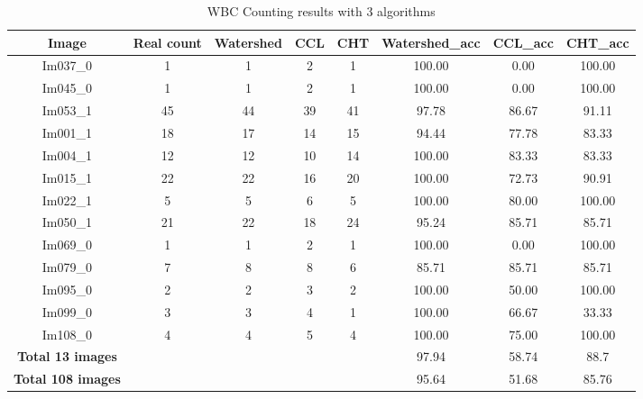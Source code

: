 \begin{table}[H]
\centering
\begin{tabular}{|  c | c | c | c | c | c | c | c |}
\hline
\textbf{Image} & \textbf{Real count} & \textbf{Watershed} & \textbf{CCL} & \textbf{CHT} & \textbf{Watershed\_acc} & \textbf{CCL\_acc} & \textbf{CHT\_acc} \\
\hline
Im037\_0 & 1 & 1 & 2 & 1 & 100.00 & 0.00 & 100.00 \\
Im045\_0 & 1 & 1 & 2 & 1 & 100.00 & 0.00 & 100.00 \\
Im053\_1 & 45 & 44 & 39 & 41 & 97.78 & 86.67 & 91.11 \\
Im001\_1 & 18 & 17 & 14 & 15 & 94.44 & 77.78 & 83.33 \\
Im004\_1 & 12 & 12 & 10 & 14 & 100.00 & 83.33 & 83.33 \\
Im015\_1 & 22 & 22 & 16 & 20 & 100.00 & 72.73 & 90.91 \\
Im022\_1 & 5 & 5 & 6 & 5 & 100.00 & 80.00 & 100.00 \\
Im050\_1 & 21 & 22 & 18 & 24 & 95.24 & 85.71 & 85.71 \\
Im069\_0 & 1 & 1 & 2 & 1 & 100.00 & 0.00 & 100.00 \\
Im079\_0 & 7 & 8 & 8 & 6 & 85.71 & 85.71 & 85.71 \\
Im095\_0 & 2 & 2 & 3 & 2 & 100.00 & 50.00 & 100.00 \\
Im099\_0 & 3 & 3 & 4 & 1 & 100.00 & 66.67 & 33.33 \\
Im108\_0 & 4 & 4 & 5 & 4 & 100.00 & 75.00 & 100.00 \\
\hline
\textbf{Total 13 images} &  &  &  &  & 97.94 & 58.74 & 88.7 \\
\textbf{Total 108 images} &  &  &  &  & 95.64 & 51.68 & 85.76 \\
\hline
\end{tabular}
\caption{WBC Counting results with 3 algorithms}
\label{table:UNet-WBC}
\end{table}